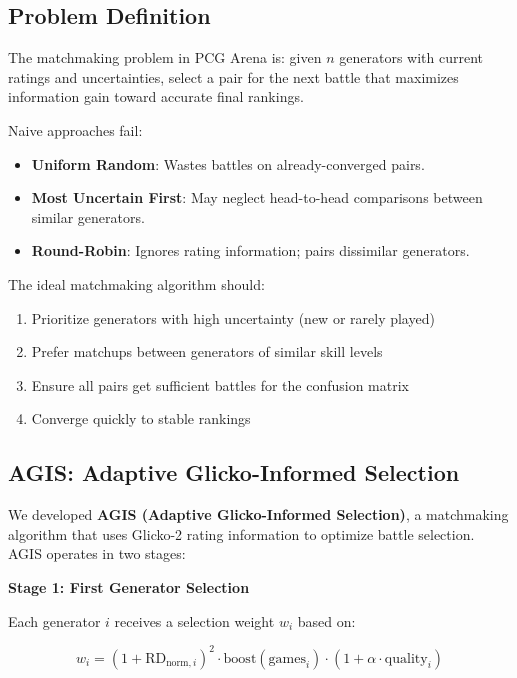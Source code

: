 \documentclass[11pt,a4paper]{article}
\theoremstyle{plain}
\theoremstyle{definition}
\theoremstyle{remark}
\begin{document}
\subsection{Problem Definition}
\label{subsec:matchmaking-problem}

The matchmaking problem in PCG Arena is: given $n$ generators with current ratings and uncertainties, select a pair for the next battle that maximizes information gain toward accurate final rankings.

Naive approaches fail:

\begin{itemize}
    \item \textbf{Uniform Random}: Wastes battles on already-converged pairs.
    \item \textbf{Most Uncertain First}: May neglect head-to-head comparisons between similar generators.
    \item \textbf{Round-Robin}: Ignores rating information; pairs dissimilar generators.
\end{itemize}

The ideal matchmaking algorithm should:

\begin{enumerate}
    \item Prioritize generators with high uncertainty (new or rarely played)
    \item Prefer matchups between generators of similar skill levels
    \item Ensure all pairs get sufficient battles for the confusion matrix
    \item Converge quickly to stable rankings
\end{enumerate}

\subsection{AGIS: Adaptive Glicko-Informed Selection}
\label{subsec:agis}

We developed \textbf{AGIS (Adaptive Glicko-Informed Selection)}, a matchmaking algorithm that uses Glicko-2 rating information to optimize battle selection. AGIS operates in two stages:

\textbf{Stage 1: First Generator Selection}

Each generator $i$ receives a selection weight $w_i$ based on:

\begin{equation}
w_i = (1 + \text{RD}_{\text{norm}, i})^2 \cdot \text{boost}(\text{games}_i) \cdot (1 + \alpha \cdot \text{quality}_i)
\end{equation}
\end{document}
